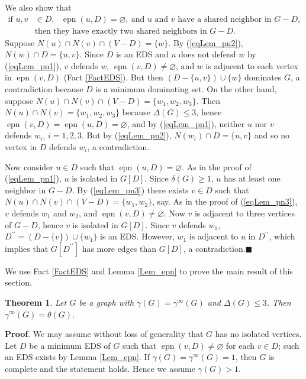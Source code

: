 \documentclass[12pt]{article}%
\newtheorem{theorem}{Theorem}[section]
\begin{document}
We also show that
\begin{align}
\text{if }u,v  &  \in D,\text{ }\operatorname{epn}(u,D)=\varnothing
,\ \text{and }u\text{ and }v\text{ have a shared neighbor in }G-D,\nonumber\\
&  \text{then they have exactly two shared neighbors in }G-D.
\label{eqLem_pn3}%
\end{align}
Suppose $N(u)\cap N(v)\cap(V-D)=\{w\}$. By (\ref{eqLem_pn2}), $N(w)\cap
D=\{u,v\}$. Since $D$ is an EDS and $u$ does not defend $w$ by
(\ref{eqLem_pn1}), $v$ defends $w$, $\operatorname{epn}(v,D)\neq\varnothing$,
and $w$ is adjacent to each vertex in $\operatorname{epn}(v,D)$ (Fact
\ref{FactEDS}). But then $(D-\{u,v\})\cup\{w\}$ dominates $G$, a contradiction
because $D$ is a minimum dominating set. On the other hand, suppose $N(u)\cap
N(v)\cap(V-D)=\{w_{1},w_{2},w_{3}\}$. Then $N(u)\cap N(v)=\{w_{1},w_{2}%
,w_{3}\}$ because $\Delta(G)\leq3$, hence $\operatorname{epn}%
(v,D)=\operatorname{epn}(u,D)=\varnothing$, and by (\ref{eqLem_pn1}), neither
$u$ nor $v$ defends $w_{i}$, $i=1,2,3$. But by (\ref{eqLem_pn2}),
$N(w_{i})\cap D=\{u,v\}$ and so no vertex in $D$ defends $w_{i}$, a contradiction.

Now consider $u\in D$ such that $\operatorname{epn}(u,D)=\varnothing$. As in
the proof of (\ref{eqLem_pn1}), $u$ is isolated in $G[D]$. Since
$\delta(G)\geq1$, $u$ has at least one neighbor in $G-D$. By (\ref{eqLem_pn3})
there exists $v\in D$ such that $N(u)\cap N(v)\cap(V-D)=\{w_{1},w_{2}\}$, say.
As in the proof of (\ref{eqLem_pn3}), $v$ defends $w_{1}$ and $w_{2}$, and
$\operatorname{epn}(v,D)\neq\varnothing$. Now $v$ is adjacent to three
vertices of $G-D$, hence $v$ is isolated in $G[D]$. Since $v$ defends $w_{1}$,
$D^{\prime\prime}=(D-\{v\})\cup\{w_{1}\}$ is an EDS. However, $w_{1}$ is
adjacent to $u$ in $D^{\prime\prime}$, which implies that $G[D^{\prime\prime
}]$ has more edges than $G[D]$, a contradiction.\hfill$\blacksquare$

\bigskip

We use Fact \ref{FactEDS} and Lemma \ref{Lem_epn} to prove the main result of
this section.

\begin{theorem}
\label{main} Let $G$ be a graph with $\gamma(G)=\gamma^{\infty}(G)$ and
$\Delta(G)\leq3$. Then $\gamma^{\infty}(G)=\theta(G)$.
\end{theorem}

\noindent\textbf{Proof}.\hspace{0.1in} We may assume without loss of
generality that $G$ has no isolated vertices. Let $D$ be a minimum EDS of $G$
such that $\operatorname{epn}(v,D)\neq\varnothing$ for each $v\in D$; such an
EDS exists by Lemma \ref{Lem_epn}. If $\gamma(G)=\gamma^{\infty}(G)=1$, then
$G$ is complete and the statement holds. Hence we assume $\gamma(G)>1$.
\end{document}
